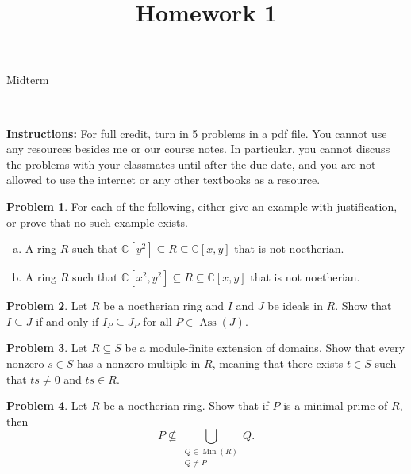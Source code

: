 \documentclass[11pt]{article}
\title{}
\date{\vspace{-0.5in}}
\title{Homework 1}
\DeclareMathOperator{\Ass}{Ass}
\DeclareMathOperator{\Min}{Min}
\theoremstyle{definition}
\newtheorem{problem}{Problem}
\begin{document}
\thispagestyle{fancy}
\pagestyle{fancy}

\vspace{3em}

\begin{center}
	{\LARGE Midterm}
\end{center}

\

\noindent
{\bf Instructions:}
For full credit, turn in 5 problems in a pdf file. 
You cannot use any resources besides me or our course notes. In particular, you cannot discuss the problems with your classmates until after the due date, and you are not allowed to use the internet or any other textbooks as a resource.


\vspace{2em}



\begin{problem}
	For each of the following, either give an example with justification, or prove that no such example exists.
	\begin{enumerate}[a)]
		\item A ring $R$ such that $\mathbb{C}[y^2] \subseteq R \subseteq \mathbb{C}[x,y]$ that is not noetherian.
		\item A ring $R$ such that $\mathbb{C}[x^2,y^2] \subseteq R \subseteq \mathbb{C}[x,y]$ that is not noetherian.
	\end{enumerate}
\end{problem}


\vfill

\begin{problem}
	Let $R$ be a noetherian ring and $I$ and $J$ be ideals in $R$. Show that $I \subseteq J$ if and only if $I_P \subseteq J_P$ for all $P \in \Ass(J)$.
\end{problem}


\vfill

\begin{problem}
	Let $R \subseteq S$ be a module-finite extension of domains. Show that every nonzero $s \in S$ has a nonzero multiple in $R$, meaning that there exists $t \in S$ such that $ts \neq 0$ and $ts \in R$.
\end{problem}



\vfill

\begin{problem}
	Let $R$ be a noetherian ring. Show that if $P$ is a minimal prime of $R$, then
	$$P \nsubseteq \bigcup_{\substack{Q \in \Min(R) \\ Q \neq P}} Q.$$
\end{problem}
\end{document}
